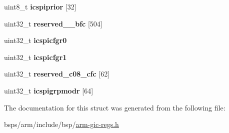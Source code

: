 \begin{DoxyCompactItemize}
uint8\+\_\+t {\bfseries icspiprior} \mbox{[}32\mbox{]}
\item 
\mbox{\label{structgic__sgi__ppi_a916c4362ff67a2e11a9bd014370aad17}} 
uint32\+\_\+t {\bfseries reserved\+\_\+\_\+bfc} \mbox{[}504\mbox{]}
\item 
\mbox{\label{structgic__sgi__ppi_ad64c2cfcaac4890937b85a6a19f388b9}} 
uint32\+\_\+t {\bfseries icspicfgr0}
\item 
\mbox{\label{structgic__sgi__ppi_acba86639bfc10e04f9c29d80b6f5e9a3}} 
uint32\+\_\+t {\bfseries icspicfgr1}
\item 
\mbox{\label{structgic__sgi__ppi_a5460c046a17c5cace17f7963096e585d}} 
uint32\+\_\+t {\bfseries reserved\+\_\+c08\+\_\+cfc} \mbox{[}62\mbox{]}
\item 
\mbox{\label{structgic__sgi__ppi_a1b8791f682b3e2ae3be99ed464efb9b6}} 
uint32\+\_\+t {\bfseries icspigrpmodr} \mbox{[}64\mbox{]}
\end{DoxyCompactItemize}


The documentation for this struct was generated from the following file\+:\begin{DoxyCompactItemize}
\item 
bsps/arm/include/bsp/\mbox{\hyperlink{arm-gic-regs_8h}{arm-\/gic-\/regs.\+h}}\end{DoxyCompactItemize}
